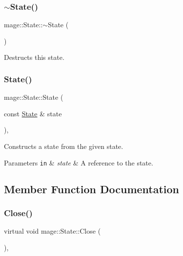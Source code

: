 \subsubsection{\texorpdfstring{$\sim$\+State()}{~State()}}
{\footnotesize\ttfamily mage\+::\+State\+::$\sim$\+State (\begin{DoxyParamCaption}{ }\end{DoxyParamCaption})}

Destructs this state. \hypertarget{classmage_1_1_state_a4515dcef9830ce6522ea6036465dcff7}{}\label{classmage_1_1_state_a4515dcef9830ce6522ea6036465dcff7} 
\subsubsection{\texorpdfstring{State()}{State()}\hspace{0.1cm}{\footnotesize\ttfamily [2/2]}}
{\footnotesize\ttfamily mage\+::\+State\+::\+State (\begin{DoxyParamCaption}\item[{const \hyperlink{classmage_1_1_state}{State} \&}]{state }\end{DoxyParamCaption})\hspace{0.3cm}{\ttfamily [private]}, {\ttfamily [delete]}}

Constructs a state from the given state.


\begin{DoxyParams}[1]{Parameters}
\mbox{\tt in}  & {\em state} & A reference to the state. \\
\hline
\end{DoxyParams}


\subsection{Member Function Documentation}
\hypertarget{classmage_1_1_state_a1edd5d756566f5b689c7a381f4e6b301}{}\label{classmage_1_1_state_a1edd5d756566f5b689c7a381f4e6b301} 
\subsubsection{\texorpdfstring{Close()}{Close()}}
{\footnotesize\ttfamily virtual void mage\+::\+State\+::\+Close (\begin{DoxyParamCaption}{ }\end{DoxyParamCaption})\hspace{0.3cm}{\ttfamily [protected]}, {\ttfamily [virtual]}}


